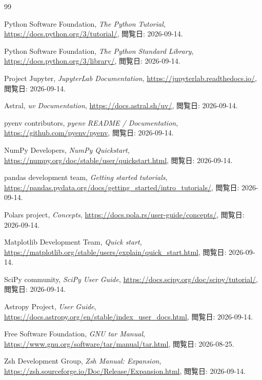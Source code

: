 \begin{thebibliography}{99}

Python Software Foundation,
\textit{The Python Tutorial},
\url{https://docs.python.org/3/tutorial/},
閲覧日: 2026-09-14.

Python Software Foundation,
\textit{The Python Standard Library},
\url{https://docs.python.org/3/library/},
閲覧日: 2026-09-14.

Project Jupyter,
\textit{JupyterLab Documentation},
\url{https://jupyterlab.readthedocs.io/},
閲覧日: 2026-09-14.

Astral,
\textit{uv Documentation},
\url{https://docs.astral.sh/uv/},
閲覧日: 2026-09-14.

pyenv contributors,
\textit{pyenv README / Documentation},
\url{https://github.com/pyenv/pyenv},
閲覧日: 2026-09-14.

NumPy Developers,
\textit{NumPy Quickstart},
\url{https://numpy.org/doc/stable/user/quickstart.html},
閲覧日: 2026-09-14.

pandas development team,
\textit{Getting started tutorials},
\url{https://pandas.pydata.org/docs/getting_started/intro_tutorials/},
閲覧日: 2026-09-14.

Polars project,
\textit{Concepts},
\url{https://docs.pola.rs/user-guide/concepts/},
閲覧日: 2026-09-14.

Matplotlib Development Team,
\textit{Quick start},
\url{https://matplotlib.org/stable/users/explain/quick_start.html},
閲覧日: 2026-09-14.

SciPy community,
\textit{SciPy User Guide},
\url{https://docs.scipy.org/doc/scipy/tutorial/},
閲覧日: 2026-09-14.

Astropy Project,
\textit{User Guide},
\url{https://docs.astropy.org/en/stable/index_user_docs.html},
閲覧日: 2026-09-14.

Free Software Foundation,
\textit{GNU tar Manual},
\url{https://www.gnu.org/software/tar/manual/tar.html},
閲覧日: 2026-08-25.

Zsh Development Group,
\textit{Zsh Manual: Expansion},
\url{https://zsh.sourceforge.io/Doc/Release/Expansion.html},
閲覧日: 2026-09-14.


\end{thebibliography}
